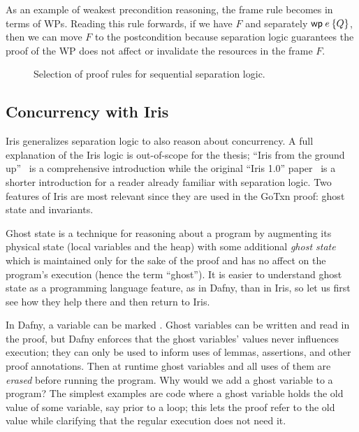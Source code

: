 As an example of weakest precondition reasoning, the frame rule becomes
 in terms of WPs. Reading this rule forwards, if we have $F$
and separately $\wpre{e}{Q}$, then we can move $F$ to the postcondition because
separation logic guarantees the proof of the WP does not affect or invalidate
the resources in the frame $F$.

\begin{figure}
\caption{Selection of proof rules for sequential separation logic.}
\label{fig:wp-rules}
\end{figure}

\subsection{Concurrency with Iris}

Iris generalizes separation logic to also reason about concurrency. A full
explanation of the Iris logic is out-of-scope for the thesis; ``Iris from the
ground up''~\cite{jung:iris-jfp} is a comprehensive introduction while the
original ``Iris 1.0'' paper~\cite{jung:iris-1} is a shorter introduction for a
reader already familiar with separation logic. Two features of Iris are most
relevant since they are used in the GoTxn proof: ghost state and invariants.

Ghost state is a technique for reasoning about a program by augmenting its
physical state (local variables and the heap) with some additional \emph{ghost
state} which is maintained only for the sake of the proof and has no affect on
the program's execution (hence the term ``ghost''). It is easier to understand
ghost state as a programming language feature, as in Dafny, than in Iris, so let
us first see how they help there and then return to Iris.

In Dafny, a variable can be marked . Ghost variables can be written
and read in the proof, but Dafny enforces that the ghost variables' values never
influences execution; they can only be used to inform uses of lemmas,
assertions, and other proof annotations. Then at runtime ghost variables and all
uses of them are \emph{erased} before running the program. Why would we add a
ghost variable to a program? The simplest examples are code where a ghost
variable holds the old value of some variable, say prior to a loop; this lets
the proof refer to the old value while clarifying that the regular execution
does not need it.

